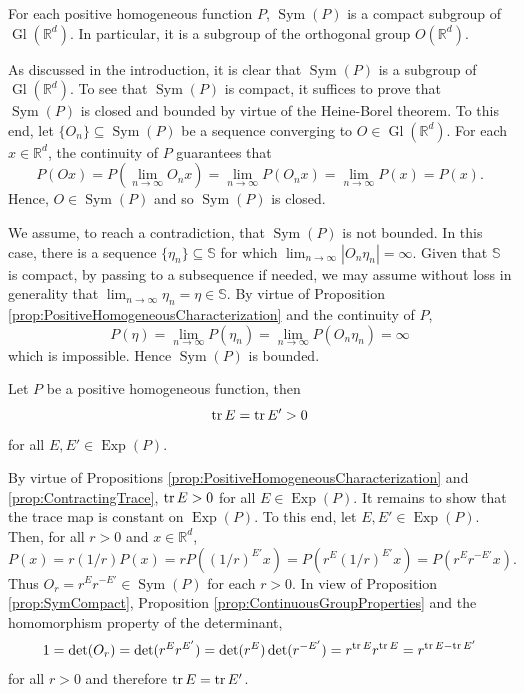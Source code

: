 \documentclass[smallextended]{svjour3}
\theoremstyle{remark}
\renewenvironment{proof}[1][\proofname]{\renewcommand\xproofname{#1}\xproof}{\endxproof}
\newcommand\Gl{\operatorname{Gl}} %
\newcommand\Sym{\operatorname{Sym}}
\newcommand\Exp{\operatorname{Exp}}
\renewcommand\det{\operatorname{det}}
\begin{document}
\begin{proposition}\label{prop:SymCompact}
For each positive homogeneous function $P$, $\Sym(P)$ is a compact subgroup of $\Gl(\mathbb{R}^d)$. In particular, it is a subgroup of the orthogonal group $O(\mathbb{R}^d)$.
\end{proposition}
\begin{proof}
As discussed in the introduction, it is clear that $\Sym(P)$ is a subgroup of $\Gl(\mathbb{R}^d)$. To see that $\Sym(P)$ is compact, it suffices to prove that $\Sym(P)$ is closed and bounded by virtue of the Heine-Borel theorem. To this end, let $\{O_n\}\subseteq\Sym(P)$ be a sequence converging to $O\in \Gl(\mathbb{R}^d)$. For each $x\in\mathbb{R}^d$, the continuity of $P$ guarantees that
\begin{equation*}
P(Ox)=P\left(\lim_{n\to\infty}O_nx\right)=\lim_{n\to\infty}P(O_nx)=\lim_{n\to\infty}P(x)=P(x).
\end{equation*}
Hence, $O\in\Sym(P)$ and so $\Sym(P)$ is closed.

We assume, to reach a contradiction, that $\Sym(P)$ is not bounded. In this case, there is a sequence $\{\eta_n\}\subseteq \mathbb{S}$ for which $\lim_{n\to\infty}|O_n\eta_n|=\infty$. Given that $\mathbb{S}$ is compact, by passing to a subsequence if needed, we may assume without loss in generality that $\lim_{n\to\infty}\eta_n=\eta\in\mathbb{S}$. By virtue of Proposition \ref{prop:PositiveHomogeneousCharacterization} and the continuity of $P$,
\begin{equation*}
P(\eta)=\lim_{n\to\infty}P(\eta_n)=\lim_{n\to\infty}P(O_n\eta_n)=\infty
\end{equation*}
which is impossible. Hence $\Sym(P)$ is bounded.
\end{proof}

\begin{corollary}\label{cor:TraceisInvariant}
Let $P$ be a positive homogeneous function, then
\begin{equation*}
\tr E=\tr E'>0
\end{equation*}
for all $E,E'\in\Exp(P)$.
\end{corollary}
\begin{proof}
By virtue of Propositions \ref{prop:PositiveHomogeneousCharacterization} and \ref{prop:ContractingTrace}, $\tr E>0$ for all $E\in\Exp(P)$. It remains to show that the trace map is constant on $\Exp(P)$. To this end, let $E,E'\in\Exp(P)$. Then, for all $r>0$ and $x\in\mathbb{R}^d$,
\begin{equation*}
P(x)=r(1/r)P(x)=rP((1/r)^{E'}x)=P(r^E(1/r)^{E'}x)=P(r^{E}r^{-E'}x).
\end{equation*}
Thus $O_r=r^{E}r^{-E'}\in\Sym(P)$ for each $r>0$. In view of Proposition \ref{prop:SymCompact}, Proposition \ref{prop:ContinuousGroupProperties} and the homomorphism property of the determinant,
\begin{equation*}
1=\det(O_r)=\det(r^{E}r^{E'})=\det(r^{E})\det(r^{-E'})=r^{\tr E}r^{\tr E}=r^{\tr E-\tr E'}
\end{equation*}
for all $r>0$ and therefore $\tr E=\tr E'$.
\end{proof}
\end{document}
